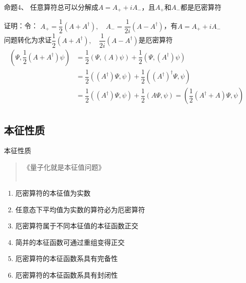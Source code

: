 \begin{frame} [allowframebreaks=]
    \frametitle{}
    \begin{atcbox}{命题4、}
       任意算符总可以分解成$A=A_+ +iA_-$，且$A_+$和$A_-$都是厄密算符
    \end{atcbox}
    \alert{证明：}令：
    $A_+=\dfrac{1}{2} (A+A^\dagger), \quad A_-=\dfrac{1}{2i} (A-A^\dagger) $，有$A=A_+ +iA_-$\\
    问题转化为求证$\dfrac{1}{2} (A+A^\dagger), \quad \dfrac{1}{2i} (A-A^\dagger) $是厄密算符\\
    \begin{equation*}
        \begin{split}
            (\Psi, \dfrac{1}{2} (A+A^\dagger)\psi ) &=\dfrac{1}{2}(\Psi, (A)\psi) + \dfrac{1}{2}(\Psi, (A^\dagger)\psi) \\
            &= \dfrac{1}{2}((A^\dagger)\Psi, \psi) + \dfrac{1}{2}((A^\dagger)^\dagger\Psi, \psi) \\
            &= \dfrac{1}{2}((A^\dagger)\Psi, \psi) + \dfrac{1}{2}(A\Psi, \psi)= ( \dfrac{1}{2}(A^\dagger + A) \Psi, \psi ) \\
         \end{split}
    \end{equation*}  
\end{frame} 

\subsection{本征性质}

\begin{frame}{本征性质}   
    \begin{quote}
        《量子化就是本征值问题》\\
        ~~\\
     \end{quote}
    \begin{enumerate}
        \item 厄密算符的本征值为实数
        \item 任意态下平均值为实数的算符必为厄密算符
        \item 厄密算符属于不同本征值的本征函数正交
        \item 简并的本征函数可通过重组变得正交
        \item 厄密算符的本征函数系具有完备性
        \item 厄密算符的本征函数系具有封闭性
    \end{enumerate}    

\end{frame} 

